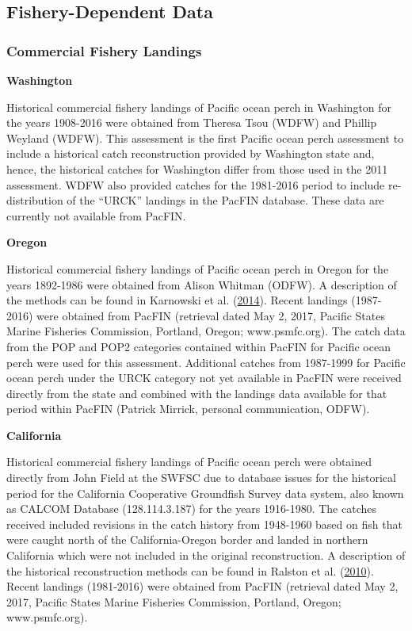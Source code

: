 \documentclass[12pt,]{article}
\begin{document}
\subsection{Fishery-Dependent Data}\label{fishery-dependent-data}

\subsubsection{Commercial Fishery
Landings}\label{commercial-fishery-landings}

\textbf{Washington}

Historical commercial fishery landings of Pacific ocean perch in
Washington for the years 1908-2016 were obtained from Theresa Tsou
(WDFW) and Phillip Weyland (WDFW). This assessment is the first Pacific
ocean perch assessment to include a historical catch reconstruction
provided by Washington state and, hence, the historical catches for
Washington differ from those used in the 2011 assessment. WDFW also
provided catches for the 1981-2016 period to include re-distribution of
the ``URCK'' landings in the PacFIN database. These data are currently
not available from PacFIN.

\textbf{Oregon}

Historical commercial fishery landings of Pacific ocean perch in Oregon
for the years 1892-1986 were obtained from Alison Whitman (ODFW). A
description of the methods can be found in Karnowski et al.
(\protect\hyperlink{ref-karnowski_historical_2014}{2014}). Recent
landings (1987-2016) were obtained from PacFIN (retrieval dated May 2,
2017, Pacific States Marine Fisheries Commission, Portland, Oregon;
www.psmfc.org). The catch data from the POP and POP2 categories
contained within PacFIN for Pacific ocean perch were used for this
assessment. Additional catches from 1987-1999 for Pacific ocean perch
under the URCK category not yet available in PacFIN were received
directly from the state and combined with the landings data available
for that period within PacFIN (Patrick Mirrick, personal communication,
ODFW).

\textbf{California}

Historical commercial fishery landings of Pacific ocean perch were
obtained directly from John Field at the SWFSC due to database issues
for the historical period for the California Cooperative Groundfish
Survey data system, also known as CALCOM Database (128.114.3.187) for
the years 1916-1980. The catches received included revisions in the
catch history from 1948-1960 based on fish that were caught north of the
California-Oregon border and landed in northern California which were
not included in the original reconstruction. A description of the
historical reconstruction methods can be found in Ralston et al.
(\protect\hyperlink{ref-ralston_documentation_2010}{2010}). Recent
landings (1981-2016) were obtained from PacFIN (retrieval dated May 2,
2017, Pacific States Marine Fisheries Commission, Portland, Oregon;
www.psmfc.org).
\end{document}

